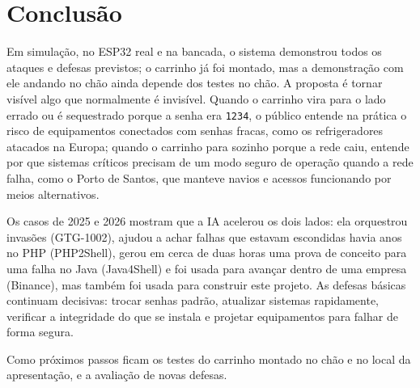 \documentclass[12pt,openright,oneside,a4paper,english,brazil]{abntex2}
\begin{document}
\chapter{Conclusão}

Em simulação, no ESP32 real e na bancada, o sistema demonstrou todos os ataques e defesas previstos; o carrinho já foi montado, mas a demonstração com ele andando no chão ainda depende dos testes no chão. A proposta é tornar visível algo que normalmente é invisível. Quando o carrinho vira para o lado errado ou é sequestrado porque a senha era \texttt{1234}, o público entende na prática o risco de equipamentos conectados com senhas fracas, como os refrigeradores atacados na Europa; quando o carrinho para sozinho porque a rede caiu, entende por que sistemas críticos precisam de um modo seguro de operação quando a rede falha, como o Porto de Santos, que manteve navios e acessos funcionando por meios alternativos.

Os casos de 2025 e 2026 mostram que a IA acelerou os dois lados: ela orquestrou invasões (GTG-1002), ajudou a achar falhas que estavam escondidas havia anos no PHP (PHP2Shell), gerou em cerca de duas horas uma prova de conceito para uma falha no Java (Java4Shell) e foi usada para avançar dentro de uma empresa (Binance), mas também foi usada para construir este projeto. As defesas básicas continuam decisivas: trocar senhas padrão, atualizar sistemas rapidamente, verificar a integridade do que se instala e projetar equipamentos para falhar de forma segura.

Como próximos passos ficam os testes do carrinho montado no chão e no local da apresentação, e a avaliação de novas defesas.

\postextual


\end{document}
